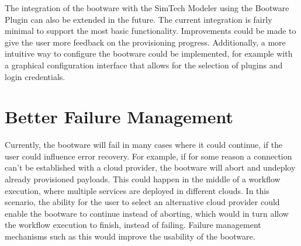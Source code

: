 The integration of the bootware with the SimTech Modeler using the Bootware Plugin can also be extended in the future.
The current integration is fairly minimal to support the most basic functionality.
Improvements could be made to give the user more feedback on the provisioning progress.
Additionally, a more intuitive way to configure the bootware could be implemented, for example with a graphical configuration interface that allows for the selection of plugins and login credentials.

\section{Better Failure Management}

Currently, the bootware will fail in many cases where it could continue, if the user could influence error recovery.
For example, if for some reason a connection can't be established with a cloud provider, the bootware will abort and undeploy already provisioned payloads.
This could happen in the middle of a workflow execution, where multiple services are deployed in different clouds.
In this scenario, the ability for the user to select an alternative cloud provider could enable the bootware to continue instead of aborting, which would in turn allow the workflow execution to finish, instead of failing.
Failure management mechanisms such as this would improve the usability of the bootware.
